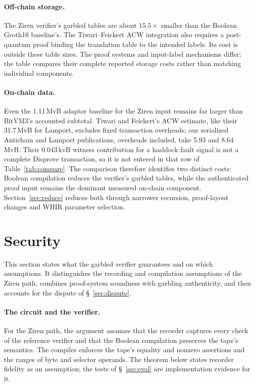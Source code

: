 \documentclass[11pt]{article}
\begin{document}
\paragraph{Off-chain storage.} The Ziren verifier's garbled tables are about
$15.5\times$ smaller than the Boolean Groth16 baseline's. The Tiwari--Feickert
ACW integration also requires a post-quantum proof binding the
translation table to the intended labels. Its cost is outside these table
sizes. The proof systems and input-label mechanisms differ; the table compares
their complete reported storage costs rather than matching individual components.

\paragraph{On-chain data.} Even the 1.11\,MvB adaptor baseline for the Ziren
input remains far larger than BitVM3's accounted subtotal. Tiwari and
Feickert's ACW estimate, like their 31.7\,MvB for Lamport, excludes fixed
transaction overheads; our serialized Antichain and Lamport publications,
overheads included, take 5.93 and 8.64\,MvB. Their 0.043\,kvB witness
contribution for a hashlock fault signal is not a complete Disprove
transaction, so it is not entered in that row of Table~\ref{tab:compare}.
The comparison therefore identifies two distinct costs: Boolean compilation
reduces the verifier's garbled tables, while the authenticated proof input
remains the dominant measured on-chain component. Section~\ref{sec:reduce}
reduces both through narrower recursion, proof-layout changes and WHIR
parameter selection.

\section{Security}\label{sec:security}

This section states what the garbled verifier guarantees and on which
assumptions. It distinguishes the recording and compilation assumptions of
the Ziren path, combines
proof-system soundness with garbling authenticity, and then accounts for
the dispute of \S~\ref{sec:dispute}.

\paragraph{The circuit and the verifier.} For the Ziren path, the argument
assumes that the recorder captures every check of the reference verifier and
that the Boolean compilation preserves the tape's semantics. The compiler enforces the tape's equality and nonzero assertions and the ranges of byte
and selector operands. The theorem below states recorder fidelity as an
assumption; the tests of \S~\ref{sec:eval} are implementation evidence for it.
\end{document}
